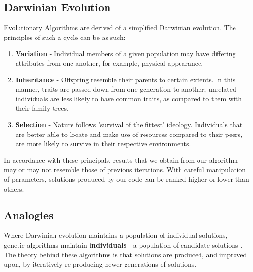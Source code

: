 \documentclass[conference,compsoc]{IEEEtran}
\begin{document}
\subsection{Darwinian Evolution}
Evolutionary Algorithms are derived of a simplified Darwinian evolution. The principles of such a cycle can be as such:
\begin{enumerate}
    \item \textbf{Variation} - Individual members of a given population may have differing attributes 
    from one another, for example, physical appearance.
    \item \textbf{Inheritance} - Offspring resemble their parents to certain extents. 
    In this manner, traits are passed down from one generation to another; unrelated individuals are less likely to have common traits, as 
    compared to them with their family trees.
    \item \textbf{Selection} - Nature follows 'survival of the fittest' ideology. Individuals that 
    are better able to locate and make use of resources compared to their peers, are more likely to survive in their respective environments. 
\end{enumerate}
In accordance with these principals, results that we obtain from our algorithm may or may not resemble those of 
previous iterations. With careful manipulation of parameters, solutions produced by our code can be ranked 
higher or lower than others.
\subsection{Analogies}
Where Darwinian evolution maintains a population of individual solutions, genetic algorithms maintain 
\textbf{individuals} - a population of candidate solutions \cite{Wiransky-GA}. The theory behind these 
algorithms is that solutions are produced, and improved upon, by iteratively re-producing newer generations of solutions.
\end{document}
